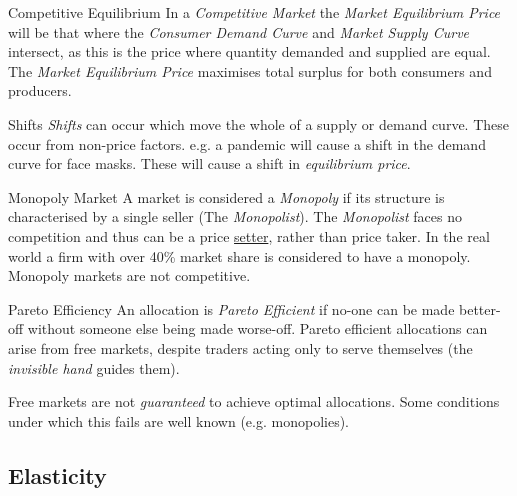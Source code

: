 \documentclass[11pt,a4paper]{article}
\begin{document}
\begin{definition}{Competitive Equilibrium}
  In a \textit{Competitive Market} the \textit{Market Equilibrium Price} will be that where the \textit{Consumer Demand Curve} and \textit{Market Supply Curve} intersect, as this is the price where quantity demanded and supplied are equal. The \textit{Market Equilibrium Price} maximises total surplus for both consumers and producers.
\end{definition}

\begin{definition}{Shifts}
  \textit{Shifts} can occur which move the whole of a supply or demand curve. These occur from non-price factors. e.g. a pandemic will cause a shift in the demand curve for face masks. These will cause a shift in  \textit{equilibrium price}.
\end{definition}

\begin{definition}{Monopoly Market}
  A market is considered a \textit{Monopoly} if its structure is characterised by a single seller (The \textit{Monopolist}). The \textit{Monopolist} faces no competition and thus can be a price \underline{setter}, rather than price taker. In the real world a firm with over 40\% market share is considered to have a monopoly. Monopoly markets are not competitive.
\end{definition}

\begin{definition}{Pareto Efficiency}
  An allocation is \textit{Pareto Efficient} if no-one can be made better-off without someone else being made worse-off. Pareto efficient allocations can arise from free markets, despite traders acting only to serve themselves (the \textit{invisible hand} guides them).
  \par Free markets are not \textit{guaranteed} to achieve optimal allocations. Some conditions under which this fails are well known (e.g. monopolies).
\end{definition}

\subsection{Elasticity}
\end{document}
